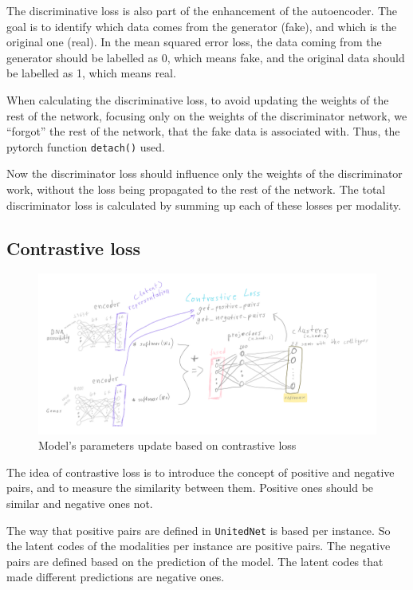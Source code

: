\documentclass[12pt, a4paper]{article}
\begin{document}
The discriminative loss is also part of the enhancement of the autoencoder. The goal is to identify which data comes from the generator (fake), and which is the original one (real). In the mean squared error loss, the data coming from the generator should be labelled as 0, which means fake, and the original data should be labelled as 1, which means real.

When calculating the discriminative loss, to avoid updating the weights of the rest of the network, focusing only on the weights of the discriminator network, we “forgot” the rest of the network, that the fake data is associated with. Thus, the pytorch function \verb|detach()| used. 

Now the discriminator loss should influence only the weights of the discriminator work, without the loss being propagated to the rest of the network. The total discriminator loss is calculated by summing up each of these losses per modality.

\clearpage


\subsection{Contrastive loss}

\begin{figure}[h!]
  \centering
  \includegraphics[width=\textwidth]{contrastive_loss.png}
  \caption{Model's parameters update based on contrastive loss}
\end{figure}

The idea of contrastive loss is to introduce the concept of positive and negative pairs, and to measure the similarity between them. Positive ones should be similar and negative ones not.

The way that positive pairs are defined in \verb|UnitedNet| is based per instance. So the latent codes of the modalities per instance are positive pairs. The negative pairs are defined based on the prediction of the model. The latent codes that made different predictions are negative ones.
\end{document}
